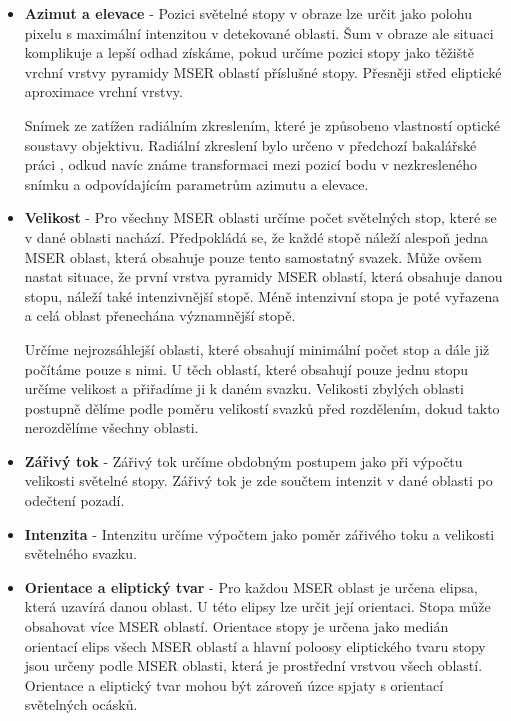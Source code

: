 \begin{itemize}
	\item \textbf{Azimut a elevace} - Pozici světelné stopy v obraze lze určit jako polohu pixelu s maximální intenzitou v detekované oblasti. Šum v obraze ale situaci komplikuje a lepší odhad získáme, pokud určíme pozici stopy jako těžiště vrchní vrstvy pyramidy MSER oblastí příslušné stopy. Přesněji střed eliptické aproximace vrchní vrstvy. 
	
	Snímek ze zatížen radiálním zkreslením, které je způsobeno vlastností optické soustavy objektivu. Radiální zkreslení bylo určeno v předchozí bakalářské práci \cite{Drapela}, odkud navíc známe transformaci mezi pozicí bodu v nezkresleného snímku a odpovídajícím parametrům azimutu a elevace.
	
	\item \textbf{Velikost} - Pro všechny MSER oblasti určíme počet světelných stop, které se v dané oblasti nachází. Předpokládá se, že každé stopě náleží alespoň jedna MSER oblast, která obsahuje pouze tento samostatný svazek. Může ovšem nastat situace, že první vrstva pyramidy MSER oblastí, která obsahuje danou stopu, náleží také intenzivnější stopě. Méně intenzivní stopa je poté vyřazena a celá oblast přenechána významnější stopě. 
	
 	Určíme nejrozsáhlejší oblasti, které obsahují minimální počet stop a dále již počítáme pouze s nimi. U těch oblastí, které obsahují pouze jednu stopu určíme velikost a přiřadíme ji k daném svazku. Velikosti zbylých oblasti postupně dělíme podle poměru velikostí svazků před rozdělením, dokud takto nerozdělíme všechny oblasti.   
	\item \textbf{Zářivý tok} - Zářivý tok určíme obdobným postupem jako při výpočtu velikosti světelné stopy. Zářivý tok je zde součtem intenzit v dané oblasti po odečtení pozadí.   
	\item \textbf{Intenzita} - Intenzitu určíme výpočtem jako poměr zářivého toku a velikosti světelného svazku.
	\item \textbf{Orientace a eliptický tvar} -  Pro každou MSER oblast je určena elipsa, která uzavírá danou oblast. U této elipsy lze určit její orientaci. Stopa může obsahovat více MSER oblastí. Orientace stopy je určena jako medián orientací elips všech MSER oblastí a hlavní poloosy eliptického tvaru stopy jsou určeny podle MSER oblasti, která je prostřední vrstvou všech oblastí. Orientace a eliptický tvar mohou být zároveň úzce spjaty s orientací světelných ocásků.		
		
\end{itemize}

